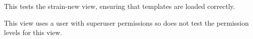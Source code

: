 \documentclass[letterpaper,10pt,english]{sphinxmanual}
\begin{document}
\begin{fulllineitems}
\begin{fulllineitems}
\end{fulllineitems}


\begin{fulllineitems}
\label{animals:mousedb.animal.tests.StrainViewTests.test_strain_new}
This tests the strain-new view, ensuring that templates are loaded correctly.

This view uses a user with superuser permissions so does not test the permission levels for this view.

\end{fulllineitems}


\end{fulllineitems}

\end{document}
